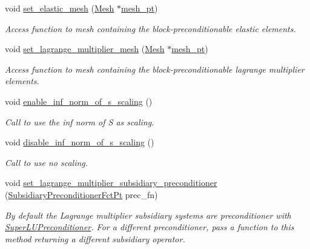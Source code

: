 \begin{DoxyCompactItemize}
void \hyperlink{classoomph_1_1PseudoElasticPreconditionerOld_a96464001afad81606a6d298f4045de70}{set\+\_\+elastic\+\_\+mesh} (\hyperlink{classoomph_1_1Mesh}{Mesh} $\ast$\hyperlink{classoomph_1_1BlockPreconditioner_a3c0e92cb77c3e3179007fe9fd99b6428}{mesh\+\_\+pt})
\begin{DoxyCompactList}\small\item\em Access function to mesh containing the block-\/preconditionable elastic elements. \end{DoxyCompactList}\item 
void \hyperlink{classoomph_1_1PseudoElasticPreconditionerOld_a432b5e0501644ae3fa6a9dadd8f52c60}{set\+\_\+lagrange\+\_\+multiplier\+\_\+mesh} (\hyperlink{classoomph_1_1Mesh}{Mesh} $\ast$\hyperlink{classoomph_1_1BlockPreconditioner_a3c0e92cb77c3e3179007fe9fd99b6428}{mesh\+\_\+pt})
\begin{DoxyCompactList}\small\item\em Access function to mesh containing the block-\/preconditionable lagrange multiplier elements. \end{DoxyCompactList}\item 
void \hyperlink{classoomph_1_1PseudoElasticPreconditionerOld_a5175c5ba92a63e7e47ca87883753b28c}{enable\+\_\+inf\+\_\+norm\+\_\+of\+\_\+s\+\_\+scaling} ()
\begin{DoxyCompactList}\small\item\em Call to use the inf norm of S as scaling. \end{DoxyCompactList}\item 
void \hyperlink{classoomph_1_1PseudoElasticPreconditionerOld_a5b23f319564110f34c07fbaacd40e446}{disable\+\_\+inf\+\_\+norm\+\_\+of\+\_\+s\+\_\+scaling} ()
\begin{DoxyCompactList}\small\item\em Call to use no scaling. \end{DoxyCompactList}\item 
void \hyperlink{classoomph_1_1PseudoElasticPreconditionerOld_ab0f5cd103d172fcb33be52c17bb741d3}{set\+\_\+lagrange\+\_\+multiplier\+\_\+subsidiary\+\_\+preconditioner} (\hyperlink{classoomph_1_1PseudoElasticPreconditionerOld_a8ee80a4a55139190a6e2a16fa175e75f}{Subsidiary\+Preconditioner\+Fct\+Pt} prec\+\_\+fn)
\begin{DoxyCompactList}\small\item\em By default the Lagrange multiplier subsidiary systems are preconditioner with \hyperlink{classoomph_1_1SuperLUPreconditioner}{Super\+L\+U\+Preconditioner}. For a different preconditioner, pass a function to this method returning a different subsidiary operator. \end{DoxyCompactList}\item 

\end{DoxyCompactItemize}

